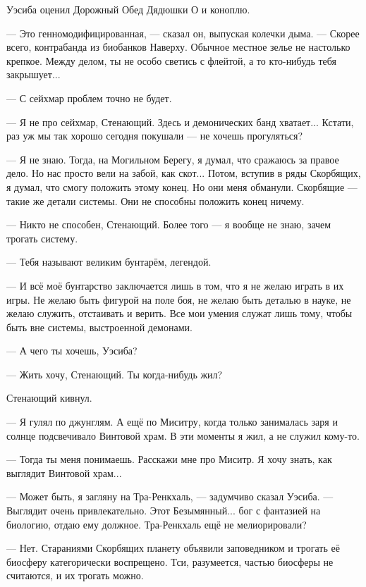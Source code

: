 Уэсиба оценил Дорожный Обед Дядюшки О и коноплю.

--- Это генномодифицированная, --- сказал он, выпуская колечки дыма.
--- Скорее всего, контрабанда из биобанков Наверху.
Обычное местное зелье не настолько крепкое.
Между делом, ты не особо светись с флейтой, а то кто-нибудь тебя закрышует...

--- С сейхмар проблем точно не будет.

--- Я не про сейхмар, Стенающий.
Здесь и демонических банд хватает...
Кстати, раз уж мы так хорошо сегодня покушали --- не хочешь прогуляться?

\razd

--- Я не знаю.
Тогда, на Могильном Берегу, я думал, что сражаюсь за правое дело.
Но нас просто вели на забой, как скот...
Потом, вступив в ряды Скорбящих, я думал, что смогу положить этому конец.
Но они меня обманули.
Скорбящие --- такие же детали системы.
Они не способны положить конец ничему.

--- Никто не способен, Стенающий.
Более того --- я вообще не знаю, зачем трогать систему.

--- Тебя называют великим бунтарём, легендой.

--- И всё моё бунтарство заключается лишь в том, что я не желаю играть в их игры.
Не желаю быть фигурой на поле боя, не желаю быть деталью в науке, не желаю служить, отстаивать и верить.
Все мои умения служат лишь тому, чтобы быть вне системы, выстроенной демонами.

--- А чего ты хочешь, Уэсиба?

--- Жить хочу, Стенающий.
Ты когда-нибудь жил?

Стенающий кивнул.

--- Я гулял по джунглям.
А ещё по Миситру, когда только занималась заря и солнце подсвечивало Винтовой храм.
В эти моменты я жил, а не служил кому-то.

--- Тогда ты меня понимаешь.
Расскажи мне про Миситр.
Я хочу знать, как выглядит Винтовой храм...

\razd

--- Может быть, я загляну на Тра-Ренкхаль, --- задумчиво сказал Уэсиба.
--- Выглядит очень привлекательно.
Этот Безымянный... бог с фантазией на биологию, отдаю ему должное.
Тра-Ренкхаль ещё не мелиорировали?

--- Нет.
Стараниями Скорбящих планету объявили заповедником и трогать её биосферу категорически воспрещено.
Тси, разумеется, частью биосферы не считаются, и их трогать можно.

